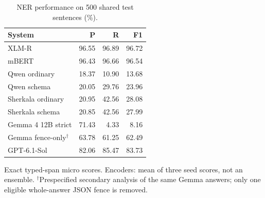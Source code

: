 \begin{table}[t]
\centering
\caption{NER performance on 500 shared test sentences (\%).}
\label{tab:ner-results}
\begingroup\fontsize{8}{9.3}\selectfont
\setlength{\tabcolsep}{3.2pt}\renewcommand{\arraystretch}{1.08}
\begin{tabular}{@{}lrrr@{}}
\toprule
System & P & R & F1\\
\midrule
XLM-R & 96.55 & 96.89 & 96.72\\
mBERT & 96.43 & 96.66 & 96.54\\
Qwen ordinary & 18.37 & 10.90 & 13.68\\
Qwen schema & 20.05 & 29.76 & 23.96\\
Sherkala ordinary & 20.95 & 42.56 & 28.08\\
Sherkala schema & 20.85 & 42.56 & 27.99\\
Gemma 4 12B strict & 71.43 & 4.33 & 8.16\\
Gemma fence-only$^{\dagger}$ & 63.78 & 61.25 & 62.49\\
GPT-6.1-Sol & 82.06 & 85.47 & 83.73\\
\bottomrule
\end{tabular}
\par\smallskip
\begin{minipage}{\columnwidth}\raggedright\fontsize{8}{9.3}\selectfont
Exact typed-span micro scores. Encoders: mean of three seed scores, not an ensemble. $^{\dagger}$Prespecified secondary analysis of the same Gemma answers; only one eligible whole-answer JSON fence is removed.
\end{minipage}\endgroup
\end{table}
